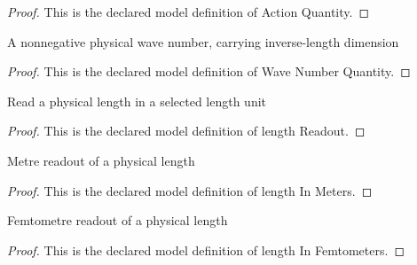\begin{proof}
  This is the declared model definition of Action Quantity.
\end{proof}
\begin{definition}
  \label{def:physics:phyx-mini-0615:phyxminiproblems-problemphyxmini0615-wavenumberquantity}
  A nonnegative physical wave number, carrying inverse-length dimension
\end{definition}
\begin{proof}
  This is the declared model definition of Wave Number Quantity.
\end{proof}
\begin{definition}
  \label{def:physics:phyx-mini-0615:phyxminiproblems-problemphyxmini0615-lengthreadout}
  Read a physical length in a selected length unit
\end{definition}
\begin{proof}
  This is the declared model definition of length Readout.
\end{proof}
\begin{definition}
  \label{def:physics:phyx-mini-0615:phyxminiproblems-problemphyxmini0615-lengthinmeters}
  Metre readout of a physical length
\end{definition}
\begin{proof}
  This is the declared model definition of length In Meters.
\end{proof}
\begin{definition}
  \label{def:physics:phyx-mini-0615:phyxminiproblems-problemphyxmini0615-lengthinfemtometers}
  Femtometre readout of a physical length
\end{definition}
\begin{proof}
  This is the declared model definition of length In Femtometers.
\end{proof}
